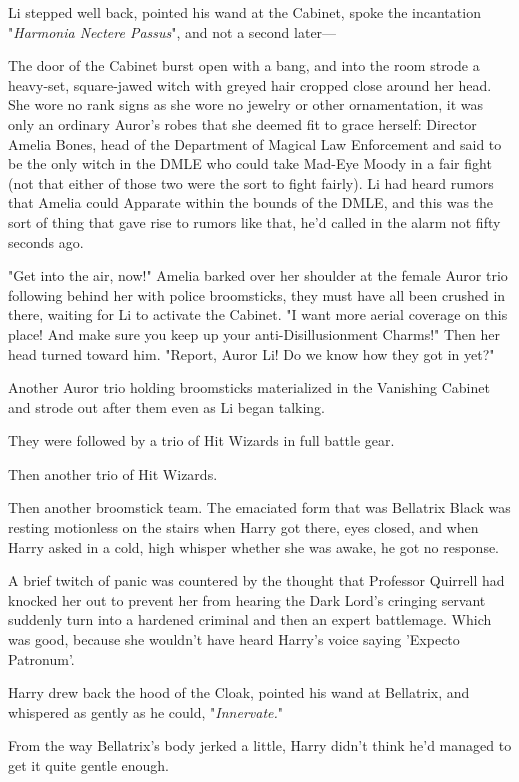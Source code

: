 Li stepped well back, pointed his wand at the Cabinet, spoke the incantation 
"\emph{Harmonia Nectere Passus}", and not a second later---

The door of the Cabinet burst open with a bang, and into the room strode a 
heavy-set, square-jawed witch with greyed hair cropped close around her head. 
She wore no rank signs as she wore no jewelry or other ornamentation, it was 
only an ordinary Auror's robes that she deemed fit to grace herself: Director 
Amelia Bones, head of the Department of Magical Law Enforcement and said to be 
the only witch in the DMLE who could take Mad-Eye Moody in a fair fight (not 
that either of those two were the sort to fight fairly). Li had heard rumors 
that Amelia could Apparate within the bounds of the DMLE, and this was the sort 
of thing that gave rise to rumors like that, he'd called in the alarm not fifty 
seconds ago.

"Get into the air, now!" Amelia barked over her shoulder at the female Auror 
trio following behind her with police broomsticks, they must have all been 
crushed in there, waiting for Li to activate the Cabinet. "I want more aerial 
coverage on this place! And make sure you keep up your anti-Disillusionment 
Charms!" Then her head turned toward him. "Report, Auror Li! Do we know how 
they got in yet?"

Another Auror trio holding broomsticks materialized in the Vanishing Cabinet 
and strode out after them even as Li began talking.

They were followed by a trio of Hit Wizards in full battle gear.

Then another trio of Hit Wizards.

Then another broomstick team.
\sbreak
The emaciated form that was Bellatrix Black was resting motionless on the 
stairs when Harry got there, eyes closed, and when Harry asked in a cold, high 
whisper whether she was awake, he got no response.

A brief twitch of panic was countered by the thought that Professor Quirrell 
had knocked her out to prevent her from hearing the Dark Lord's cringing 
servant suddenly turn into a hardened criminal and then an expert battlemage. 
Which was good, because she wouldn't have heard Harry's voice saying 'Expecto 
Patronum'.

Harry drew back the hood of the Cloak, pointed his wand at Bellatrix, and 
whispered as gently as he could, "\emph{Innervate.}"

From the way Bellatrix's body jerked a little, Harry didn't think he'd managed 
to get it quite gentle enough.

